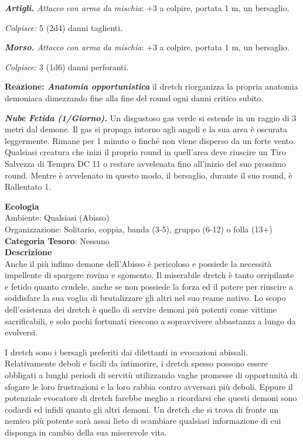 \begin{multicols}{2}
{\emph{\textbf{Artigli.} Attacco con arma da mischia}: +3 a colpire, portata 1 m, un bersaglio.

\emph{Colpisce:} 5 (2d4) danni taglienti.

\emph{\textbf{Morso.} Attacco con arma da mischia}: +3 a colpire, portata 1 m, un bersaglio.

\emph{Colpisce:} 3 (1d6) danni perforanti.

\textbf{Reazione: \emph{Anatomia opportunistica}} il dretch riorganizza la propria anatomia demoniaca dimezzando fine alla fine del round ogni danni critico subito.

\emph{\textbf{Nube Fetida (1/Giorno).}} Un disgustoso gas verde si estende in un raggio di 3 metri dal demone. Il gas si propaga intorno agli angoli e la sua area è oscurata leggermente. Rimane per 1 minuto o finché non viene disperso da un forte vento. Qualsiasi creatura che inizi il proprio round in quell'area deve riuscire un Tiro Salvezza di Tempra DC 11 o restare avvelenata fino all'inizio del suo prossimo round. Mentre è avvelenato in questo modo, il bersaglio, durante il suo round, è Rallentato 1.

\textbf{Ecologia}\\
Ambiente: Qualsiasi (Abisso)\\
Organizzazione: Solitario, coppia, banda (3-5), gruppo (6-12) o folla (13+)\\
\textbf{Categoria Tesoro}: Nessuno\\
\textbf{Descrizione}\\
Anche il più infimo demone dell'Abisso è pericoloso e possiede la necessità impellente di spargere rovina e sgomento. Il miserabile dretch è tanto orripilante e fetido quanto crudele, anche se non possiede la forza ed il potere per riuscire a soddisfare la sua voglia di brutalizzare gli altri nel suo reame nativo. Lo scopo dell'esistenza dei dretch è quello di servire demoni più potenti come vittime sacrificabili, e solo pochi fortunati riescono a sopravvivere abbastanza a lungo da evolversi.

I dretch sono i bersagli preferiti dai dilettanti in evocazioni abissali. Relativamente deboli e facili da intimorire, i dretch spesso possono essere obbligati a lunghi periodi di servitù utilizzando vaghe promesse di opportunità di sfogare le loro frustrazioni e la loro rabbia contro avversari più deboli. Eppure il potenziale evocatore di dretch farebbe meglio a ricordarsi che questi demoni sono codardi ed infidi quanto gli altri demoni. Un dretch che si trova di fronte un nemico più potente sarà assai lieto di scambiare qualsiasi informazione di cui disponga in cambio della sua miserevole vita.

}
\end{multicols}
